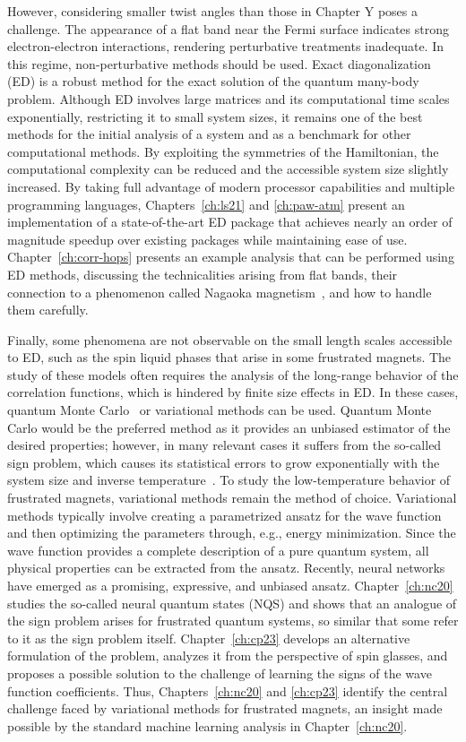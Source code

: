 However, considering smaller twist angles than those in Chapter Y poses a challenge. The appearance of a flat band near the Fermi surface indicates strong electron-electron interactions, rendering perturbative treatments inadequate. In this regime, non-perturbative methods should be used. Exact diagonalization (ED) is a robust method for the exact solution of the quantum many-body problem. Although ED involves large matrices and its computational time scales exponentially, restricting it to small system sizes, it remains one of the best methods for the initial analysis of a system and as a benchmark for other computational methods. By exploiting the symmetries of the Hamiltonian, the computational complexity can be reduced and the accessible system size slightly increased. By taking full advantage of modern processor capabilities and multiple programming languages, Chapters~\ref{ch:ls21} and \ref{ch:paw-atm} present an implementation of a state-of-the-art ED package that achieves nearly an order of magnitude speedup over existing packages while maintaining ease of use. Chapter~\ref{ch:corr-hops} presents an example analysis that can be performed using ED methods, discussing the technicalities arising from flat bands, their connection to a phenomenon called Nagaoka magnetism~\cite{Nagaok_1966_Ferromagnetism}, and how to handle them carefully.

Finally, some phenomena are not observable on the small length scales accessible to ED, such as the spin liquid phases that arise in some frustrated magnets. The study of these models often requires the analysis of the long-range behavior of the correlation functions, which is hindered by finite size effects in ED. In these cases, quantum Monte Carlo~\cite{Sandvi_1991_Quantum_Monte_C} or variational methods can be used. Quantum Monte Carlo would be the preferred method as it provides an unbiased estimator of the desired properties; however, in many relevant cases it suffers from the so-called sign problem, which causes its statistical errors to grow exponentially with the system size and inverse temperature~\cite{NP_Troyer}. To study the low-temperature behavior of frustrated magnets, variational methods remain the method of choice. Variational methods typically involve creating a parametrized ansatz for the wave function and then optimizing the parameters through, e.g., energy minimization. Since the wave function provides a complete description of a pure quantum system, all physical properties can be extracted from the ansatz. Recently, neural networks have emerged as a promising, expressive, and unbiased ansatz. Chapter~\ref{ch:nc20} studies the so-called neural quantum states (NQS) and shows that an analogue of the sign problem arises for frustrated quantum systems, so similar that some refer to it as the sign problem itself. Chapter~\ref{ch:cp23} develops an alternative formulation of the problem, analyzes it from the perspective of spin glasses, and proposes a possible solution to the challenge of learning the signs of the wave function coefficients. Thus, Chapters~\ref{ch:nc20} and \ref{ch:cp23} identify the central challenge faced by variational methods for frustrated magnets, an insight made possible by the standard machine learning analysis in Chapter~\ref{ch:nc20}.


